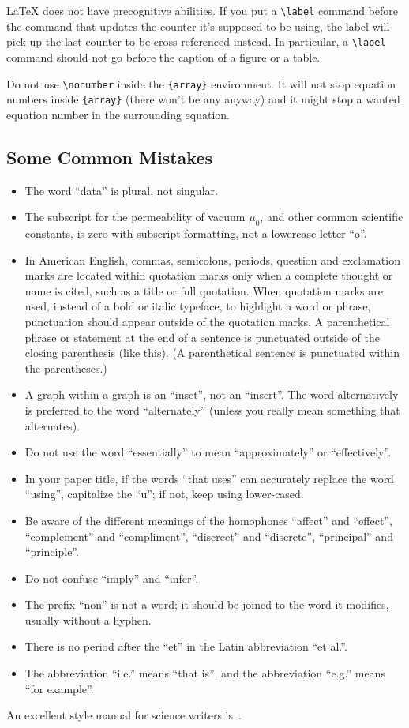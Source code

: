 {\LaTeX} does not have precognitive abilities. If you put a
\verb|\label| command before the command that updates the counter it's
supposed to be using, the label will pick up the last counter to be
cross referenced instead. In particular, a \verb|\label| command
should not go before the caption of a figure or a table.

Do not use \verb|\nonumber| inside the \verb|{array}| environment. It
will not stop equation numbers inside \verb|{array}| (there won't be
any anyway) and it might stop a wanted equation number in the
surrounding equation.

\subsection{Some Common Mistakes}\label{SCM}
\begin{itemize}
	\item The word ``data'' is plural, not singular.
	\item The subscript for the permeability of vacuum $\mu_{0}$, and other common scientific constants, is zero with subscript formatting, not a lowercase letter ``o''.
	\item In American English, commas, semicolons, periods, question and exclamation marks are located within quotation marks only when a complete thought or name is cited, such as a title or full quotation. When quotation marks are used, instead of a bold or italic typeface, to highlight a word or phrase, punctuation should appear outside of the quotation marks. A parenthetical phrase or statement at the end of a sentence is punctuated outside of the closing parenthesis (like this). (A parenthetical sentence is punctuated within the parentheses.)
	\item A graph within a graph is an ``inset'', not an ``insert''. The word alternatively is preferred to the word ``alternately'' (unless you really mean something that alternates).
	\item Do not use the word ``essentially'' to mean ``approximately'' or ``effectively''.
	\item In your paper title, if the words ``that uses'' can accurately replace the word ``using'', capitalize the ``u''; if not, keep using lower-cased.
	\item Be aware of the different meanings of the homophones ``affect'' and ``effect'', ``complement'' and ``compliment'', ``discreet'' and ``discrete'', ``principal'' and ``principle''.
	\item Do not confuse ``imply'' and ``infer''.
	\item The prefix ``non'' is not a word; it should be joined to the word it modifies, usually without a hyphen.
	\item There is no period after the ``et'' in the Latin abbreviation ``\textnormal{et al.}''.
	\item The abbreviation ``\textnormal{i.e.}'' means ``that is'', and the abbreviation ``\textnormal{e.g.}'' means ``for example''.
\end{itemize}
An excellent style manual for science writers is\ \cite{b7}.


